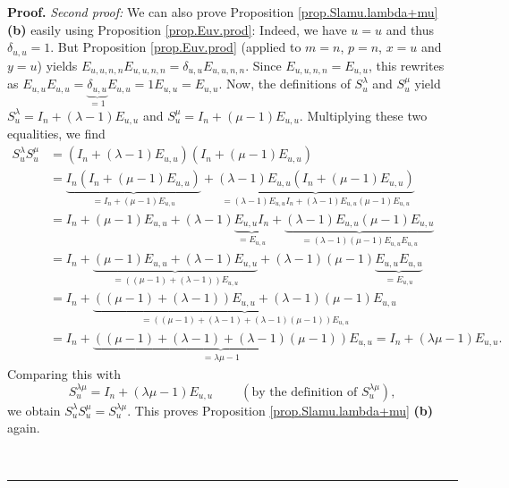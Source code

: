 \documentclass[numbers=enddot,12pt,final,onecolumn,notitlepage]{scrartcl}%
\theoremstyle{definition}
\newenvironment{proof}[1][Proof]{\noindent\textbf{#1.} }{\ \rule{0.5em}{0.5em}}
\begin{document}
\begin{proof}
\textit{Second proof:} We can also prove Proposition
\ref{prop.Slamu.lambda+mu} \textbf{(b)} easily using Proposition
\ref{prop.Euv.prod}: Indeed, we have $u=u$ and thus $\delta_{u,u}=1$. But
Proposition \ref{prop.Euv.prod} (applied to $m=n$, $p=n$, $x=u$ and $y=u$)
yields $E_{u,u,n,n}E_{u,u,n,n}=\delta_{u,u}E_{u,u,n,n}$. Since $E_{u,u,n,n}%
=E_{u,u}$, this rewrites as $E_{u,u}E_{u,u}=\underbrace{\delta_{u,u}}%
_{=1}E_{u,u}=1E_{u,u}=E_{u,u}$. Now, the definitions of $S_{u}^{\lambda}$ and
$S_{u}^{\mu}$ yield $S_{u}^{\lambda}=I_{n}+\left(  \lambda-1\right)  E_{u,u}$
and $S_{u}^{\mu}=I_{n}+\left(  \mu-1\right)  E_{u,u}$. Multiplying these two
equalities, we find%
\begin{align*}
S_{u}^{\lambda}S_{u}^{\mu}  &  =\left(  I_{n}+\left(  \lambda-1\right)
E_{u,u}\right)  \left(  I_{n}+\left(  \mu-1\right)  E_{u,u}\right) \\
&  =\underbrace{I_{n}\left(  I_{n}+\left(  \mu-1\right)  E_{u,u}\right)
}_{=I_{n}+\left(  \mu-1\right)  E_{u,u}}+\underbrace{\left(  \lambda-1\right)
E_{u,u}\left(  I_{n}+\left(  \mu-1\right)  E_{u,u}\right)  }_{=\left(
\lambda-1\right)  E_{u,u}I_{n}+\left(  \lambda-1\right)  E_{u,u}\left(
\mu-1\right)  E_{u,u}}\\
&  =I_{n}+\left(  \mu-1\right)  E_{u,u}+\left(  \lambda-1\right)
\underbrace{E_{u,u}I_{n}}_{=E_{u,u}}+\underbrace{\left(  \lambda-1\right)
E_{u,u}\left(  \mu-1\right)  E_{u,u}}_{=\left(  \lambda-1\right)  \left(
\mu-1\right)  E_{u,u}E_{u,u}}\\
&  =I_{n}+\underbrace{\left(  \mu-1\right)  E_{u,u}+\left(  \lambda-1\right)
E_{u,u}}_{=\left(  \left(  \mu-1\right)  +\left(  \lambda-1\right)  \right)
E_{u,u}}+\left(  \lambda-1\right)  \left(  \mu-1\right)  \underbrace{E_{u,u}%
E_{u,u}}_{=E_{u,u}}\\
&  =I_{n}+\underbrace{\left(  \left(  \mu-1\right)  +\left(  \lambda-1\right)
\right)  E_{u,u}+\left(  \lambda-1\right)  \left(  \mu-1\right)  E_{u,u}%
}_{=\left(  \left(  \mu-1\right)  +\left(  \lambda-1\right)  +\left(
\lambda-1\right)  \left(  \mu-1\right)  \right)  E_{u,u}}\\
&  =I_{n}+\underbrace{\left(  \left(  \mu-1\right)  +\left(  \lambda-1\right)
+\left(  \lambda-1\right)  \left(  \mu-1\right)  \right)  }_{=\lambda\mu
-1}E_{u,u}=I_{n}+\left(  \lambda\mu-1\right)  E_{u,u}.
\end{align*}
Comparing this with
\[
S_{u}^{\lambda\mu}=I_{n}+\left(  \lambda\mu-1\right)  E_{u,u}%
\ \ \ \ \ \ \ \ \ \ \left(  \text{by the definition of }S_{u}^{\lambda\mu
}\right)  ,
\]
we obtain $S_{u}^{\lambda}S_{u}^{\mu}=S_{u}^{\lambda\mu}$. This proves
Proposition \ref{prop.Slamu.lambda+mu} \textbf{(b)} again.


\end{proof}
\end{document}
